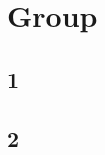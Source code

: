 \documentclass[main]{subfiles} %
\begin{document}
\chapter{Group}
\section{1}
\section{2}
\end{document}
